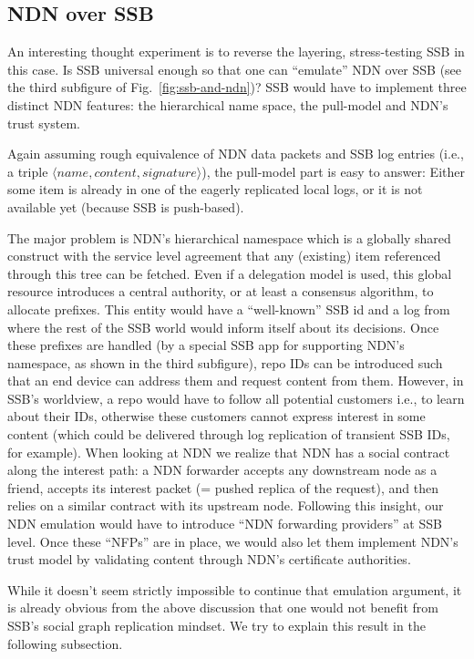 \documentclass[9pt,sigconf,rewiew]{acmart}
\begin{document}
\subsection{NDN over SSB}
\label{ssect:ndn-over-ssb}

An interesting thought experiment is to reverse the layering,
stress-testing SSB in this case. Is SSB universal enough so that one
can ``emulate'' NDN over SSB (see the third subfigure of
Fig.~\ref{fig:ssb-and-ndn})? SSB would have to implement three
distinct NDN features: the hierarchical name space, the pull-model
and NDN's trust system.

Again assuming rough equivalence of NDN data packets and SSB log
entries (i.e., a triple $\langle name,content,signature\rangle$), the
pull-model part is easy to answer: Either some item is already in one
of the eagerly replicated local logs, or it is not available yet
(because SSB is push-based).

The major problem is NDN's hierarchical namespace which is a globally
shared construct with the service level agreement that any (existing)
item referenced through this tree can be fetched.  Even if a
delegation model is used, this global resource introduces a central
authority, or at least a consensus algorithm, to allocate
prefixes. This entity would have a ``well-known'' SSB id and a log
from where the rest of the SSB world would inform itself about its
decisions. Once these prefixes are handled (by a special SSB app for
supporting NDN's namespace, as shown in the third subfigure), repo IDs
can be introduced such that an end device can address them and request
content from them. However, in SSB's worldview, a repo would have to
follow all potential customers i.e., to learn about their IDs,
otherwise these customers cannot express interest in some content
(which could be delivered through log replication of transient SSB
IDs, for example). When looking at NDN we realize that NDN has a
social contract along the interest path: a NDN forwarder accepts any
downstream node as a friend, accepts its interest packet (= pushed
replica of the request), and then relies on a similar contract with
its upstream node. Following this insight, our NDN emulation would
have to introduce ``NDN forwarding providers'' at SSB level. Once
these ``NFPs'' are in place, we would also let them implement
NDN's trust model by validating content through NDN's certificate
authorities.

While it doesn't seem strictly impossible to continue that emulation
argument, it is already obvious from the above discussion that one
would not benefit from SSB's social graph replication mindset. We try
to explain this result in the following subsection.
\end{document}
